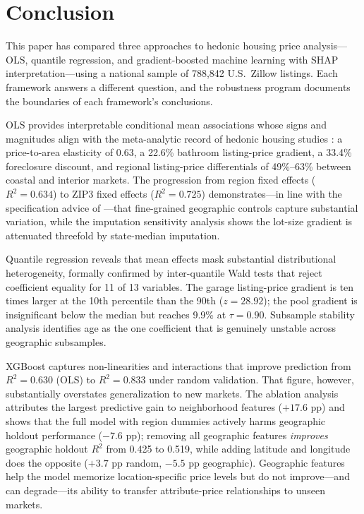 %
\section{Conclusion}
\label{sec:conclusion}

This paper has compared three approaches to hedonic housing price analysis---OLS,
quantile regression, and gradient-boosted machine learning with SHAP
interpretation---using a national sample of 788,842 U.S.\ Zillow listings. Each
framework answers a different question, and the robustness program documents the
boundaries of each framework's conclusions.

OLS provides interpretable conditional mean associations whose signs and
magnitudes align with the meta-analytic record of hedonic housing studies
\citep{sirmans2005composition}: a price-to-area elasticity of 0.63, a 22.6\%
bathroom listing-price gradient, a 33.4\% foreclosure discount, and regional
listing-price differentials of 49\%--63\% between coastal and interior markets.
The progression from region fixed effects ($R^2 = 0.634$) to ZIP3 fixed effects
($R^2 = 0.725$) demonstrates---in line with the specification advice of
\citet{kuminoff2010which}---that fine-grained geographic controls capture
substantial variation, while the imputation sensitivity analysis shows the
lot-size gradient is attenuated threefold by state-median imputation.

Quantile regression reveals that mean effects mask substantial distributional
heterogeneity, formally confirmed by inter-quantile Wald tests that reject
coefficient equality for 11 of 13 variables. The garage listing-price gradient is
ten times larger at the 10th percentile than the 90th ($z = 28.92$); the pool
gradient is insignificant below the median but reaches 9.9\% at $\tau = 0.90$.
Subsample stability analysis identifies age as the one coefficient that is
genuinely unstable across geographic subsamples.

XGBoost captures non-linearities and interactions that improve prediction from
$R^2 = 0.630$ (OLS) to $R^2 = 0.833$ under random validation. That figure,
however, substantially overstates generalization to new markets. The ablation
analysis attributes the largest predictive gain to neighborhood features
($+17.6$ pp) and shows that the full model with region dummies actively harms
geographic holdout performance ($-7.6$ pp); removing all geographic features
\emph{improves} geographic holdout $R^2$ from 0.425 to 0.519, while adding
latitude and longitude does the opposite ($+3.7$ pp random, $-5.5$ pp
geographic). Geographic features help the model memorize location-specific price
levels but do not improve---and can degrade---its ability to transfer
attribute-price relationships to unseen markets.

